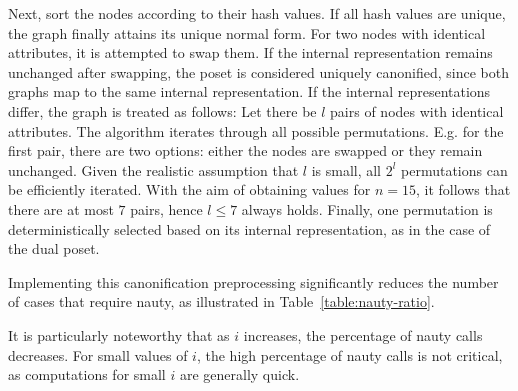 \documentclass[10pt,journal,compsoc]{IEEEtran}
\begin{document}
Next, sort the nodes according to their hash values.
If all hash values are unique, the graph finally attains its unique normal form.
For two nodes with identical attributes, it is attempted to swap them.
If the internal representation remains unchanged after swapping, the poset is considered uniquely canonified, since both graphs map to the same internal representation.
If the internal representations differ, the graph is treated as follows:
Let there be $l$ pairs of nodes with identical attributes.
The algorithm iterates through all possible permutations.
E.g. for the first pair, there are two options: either the nodes are swapped or they remain unchanged.
Given the realistic assumption that $l$ is small, all $2^l$ permutations can be efficiently iterated.
With the aim of obtaining values for $n = 15$, it follows that there are at most $7$ pairs, hence $l \leq 7$ always holds.
Finally, one permutation is deterministically selected based on its internal representation, as in the case of the dual poset.

Implementing this canonification preprocessing significantly reduces the number of cases that require nauty, as illustrated in Table~\ref{table:nauty-ratio}.

\begin{table}[!t]
  \renewcommand{\arraystretch}{1.2}
  \caption{Percentage of canonification requiring nauty for variable $n$ and $i$, where lower values are preferable.}
  \label{table:nauty-ratio}
  \centering
\end{table}

It is particularly noteworthy that as $i$ increases, the percentage of nauty calls decreases.
For small values of $i$, the high percentage of nauty calls is not critical, as computations for small $i$ are generally quick.
\end{document}
